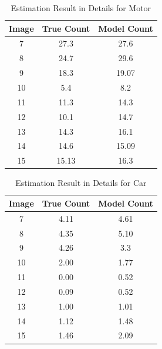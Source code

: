   \begin{table}[H]
    \begin{center}
      \begin{tabular}{ | c | c | c |} 
        \hline
        \textbf{Image} & \textbf{True Count} & \textbf{Model Count}  \\
        \hline
        7 &  27.3 &  27.6 \\
        \hline
        8 &  24.7 &  29.6 \\
        \hline
        9 &  18.3 &  19.07 \\
        \hline
        10 &  5.4 &  8.2 \\
        \hline
        11 &  11.3 &  14.3 \\
        \hline
        12 &  10.1 &  14.7 \\
        \hline
        13 &  14.3 &  16.1 \\
        \hline
        14 &  14.6 &  15.09 \\
        \hline
        15 &  15.13 &  16.3 \\
       \hline
      \end{tabular}
    \end{center}
    \caption{Estimation Result in Details for Motor}\label{tab:data-motor}
  \end{table}

  \begin{table}[H]
    \begin{center}
      \begin{tabular}{ | c | c | c |} 
        \hline
        \textbf{Image} & \textbf{True Count} & \textbf{Model Count}  \\
        \hline
        7 &  4.11&  4.61 \\
        \hline
        8 &  4.35 &  5.10 \\
        \hline
        9 &  4.26 &  3.3 \\
        \hline
        10 &  2.00 &  1.77 \\
        \hline
        11 &  0.00 &  0.52 \\
        \hline
        12 &  0.09 &  0.52 \\
        \hline
        13 &  1.00 &  1.01 \\
        \hline
        14 &  1.12 &  1.48 \\
        \hline
        15 &  1.46 &  2.09 \\
       \hline
      \end{tabular}
    \end{center}
    \caption{Estimation Result in Details for Car}\label{tab:data-car}
  \end{table}

